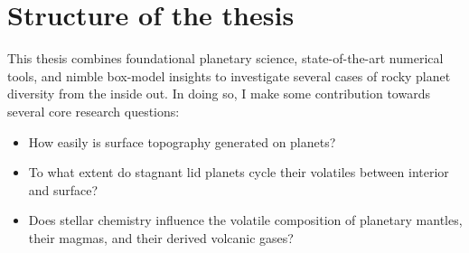 




\section{Structure of the thesis}



This thesis combines foundational planetary science, state-of-the-art numerical tools, and nimble box-model insights to investigate several cases of rocky planet diversity from the inside out. In doing so, I make some contribution towards several core research questions:

\begin{itemize}

\item How easily is surface topography generated on planets?
\item To what extent do stagnant lid planets cycle their volatiles between interior and surface?
\item Does stellar chemistry influence the volatile composition of planetary mantles, their magmas, and their derived volcanic gases?

\end{itemize}


